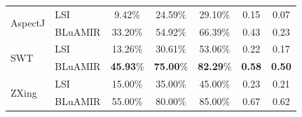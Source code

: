 \documentclass[conference]{IEEEtran}
\begin{document}
\begin{table}[!tb]
{\begin{tabular}{l|l|c|c|c|c|c}
			\multirow{2}{*}{AspectJ}       &LSI     &  9.42\%& 24.59\%&29.10\%& 0.15 & 0.07  \\ \cline{2-7}
			& BLuAMIR                                                                                                                     & 33.20\%                                                 & 54.92\%                                                 & 66.39\%                                                  &   0.43  &  0.23    \\ 
			\hline
			\multirow{2}{*}{SWT}       &LSI     &  13.26\%& 30.61\%&53.06\%& 0.22 & 0.17  \\ \cline{2-7}
			& BLuAMIR                                                                                                                     & \textbf{45.93}\%                                                 & \textbf{75.00}\%                                                 & \textbf{82.29}\%                                                  &   \textbf{0.58}  &  \textbf{0.50}    \\ 
			\hline
			\multirow{2}{*}{ZXing}       &LSI     &  15.00\%& 35.00\%&45.00\%& 0.23 & 0.21  \\ \cline{2-7}
			& BLuAMIR                                                                                                                     & 55.00\%                                                 & 80.00\%                                                 & 85.00\%                                                  &   0.67  &  0.62    \\ 
			\hline
	\end{tabular}}
    \vspace{-.2cm}
	\centering
\end{table}
\end{document}
